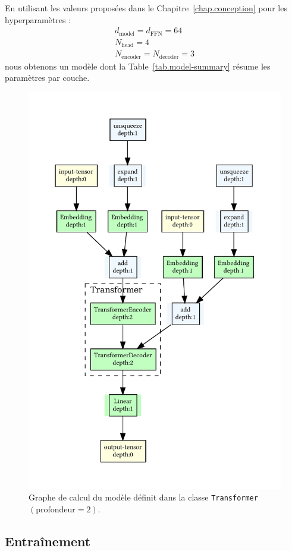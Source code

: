 En utilisant les valeurs proposées dans le Chapitre~\ref{chap.conception} pour les hyperparamètres :
\[
    \begin{array}{l}
        d_{\mathrm{model}} = d_{\mathrm{FFN}} = 64\\ 
        N_{\mathrm{head}} = 4\\ 
        N_{\mathrm{encoder}} = N_{\mathrm{decoder}} = 3
    \end{array}
\]
nous obtenons un modèle dont la Table~\ref{tab.model-summary} résume les paramètres par couche.

\begin{figure}[htb]
    \begin{center}
        \includegraphics[width=.6\textwidth]{assets/pdf/arch.pdf}
    \end{center}
    \cprotect\caption[Graphe de calcul du modèle définit dans la classe \verb|Transformer|]%
    {Graphe de calcul du modèle définit dans la classe \verb|Transformer| \((\text{profondeur} = 2).\)}
    \label{fig.arch}
\end{figure}

\subsection{Entraînement}
\label{subsec-mt-training}

